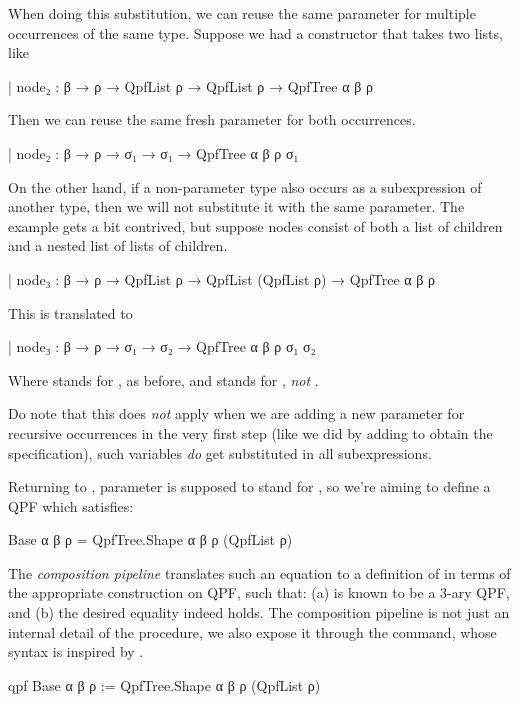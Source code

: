 \begin{remark}
  When doing this substitution, we can reuse the same parameter for multiple occurrences of the same type.
  Suppose we had a constructor that takes two lists, like
  \begin{leancode}
    | node₂ : β → ρ → QpfList ρ → QpfList ρ → QpfTree α β ρ
  \end{leancode}
  Then we can reuse the same fresh parameter  for both occurrences.
  \begin{leancode}
    | node₂ : β → ρ → σ₁ → σ₁ → QpfTree α β ρ σ₁
  \end{leancode}
  
  On the other hand, if a non-parameter type also occurs as a subexpression of another type, then
  we will not substitute it with the same parameter.
  The example gets a bit contrived, but suppose nodes consist of both a list of children and a nested list 
  of lists of children.
  \begin{leancode}
    | node₃ : β → ρ → QpfList ρ → QpfList (QpfList ρ) → QpfTree α β ρ
  \end{leancode}
  This is translated to
  \begin{leancode}
    | node₃ : β → ρ → σ₁ → σ₂ → QpfTree α β ρ σ₁ σ₂
  \end{leancode}
  Where  stands for , as before, and  stands for , \emph{not} .    
  
  Do note that this does \emph{not} apply when we are adding a new parameter for recursive occurrences in the very first step (like we did by adding  to obtain the  specification), such variables \emph{do} get substituted in all subexpressions.
  \end{remark}

Returning to , parameter  is supposed to stand for , so we're aiming to define a QPF which satisfies:
\begin{leancode}
  Base α β ρ = QpfTree.Shape α β ρ (QpfList ρ)
\end{leancode}


The \emph{composition pipeline} translates such an equation to a definition of  in terms of the appropriate construction on QPF, such that: (a)  is known to be a 3-ary QPF, and (b) the desired equality indeed holds.
The composition pipeline is not just an internal detail of the procedure, we also expose it through the \qpf{} command, whose syntax is inspired by .
\begin{leancode}
  qpf Base α β ρ := QpfTree.Shape α β ρ (QpfList ρ)
\end{leancode}




